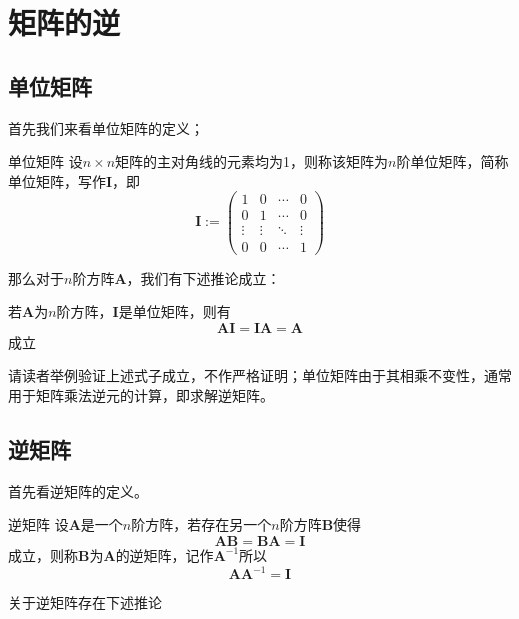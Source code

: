 \section{矩阵的逆}

\subsection{单位矩阵}

首先我们来看单位矩阵的定义；

\begin{definition}{单位矩阵}
	设$n\times n$矩阵的主对角线的元素均为1，则称该矩阵为$n$阶单位矩阵，简称单位矩阵，写作$\mathbf{I}$，即$$\mathbf{I}:=\begin{pmatrix}
		1 & 0 & \cdots & 0\\
		0 & 1 & \cdots & 0\\
		\vdots & \vdots & \ddots & \vdots\\
		0 & 0 & \cdots & 1
	   \end{pmatrix}$$
\end{definition}

那么对于$n$阶方阵$\mathbf{A}$，我们有下述推论成立：
\begin{corollary}
	若$\mathbf{A}$为$n$阶方阵，$\mathbf{I}$是单位矩阵，则有$$\mathbf{A}\mathbf{I}=\mathbf{I}\mathbf{A}=\mathbf{A}$$成立
\end{corollary}

请读者举例验证上述式子成立，不作严格证明；单位矩阵由于其相乘不变性，通常用于矩阵乘法逆元的计算，即求解逆矩阵。

\subsection{逆矩阵}

首先看逆矩阵的定义。

\begin{definition}{逆矩阵}
	设$\mathbf{A}$是一个$n$阶方阵，若存在另一个$n$阶方阵$\mathbf{B}$使得$$\mathbf{A}\mathbf{B}=\mathbf{B}\mathbf{A}=\mathbf{I}$$成立，则称$\mathbf{B}$为$\mathbf{A}$的逆矩阵，记作$\mathbf{A}^{-1}$所以$$\mathbf{A}\mathbf{A}^{-1}=\mathbf{I}$$
\end{definition}

关于逆矩阵存在下述推论

